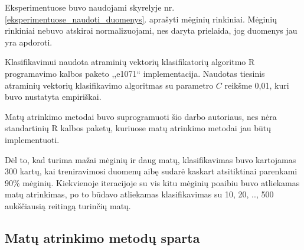 Eksperimentuose buvo naudojami skyrelyje nr. \ref{eksperimentuose_naudoti_duomenys}. aprašyti mėginių rinkiniai. Mėginių rinkiniai nebuvo atskirai normalizuojami, nes daryta prielaida, jog duomenys jau yra apdoroti. 

Klasifikavimui naudota atraminių vektorių klasifikatorių algoritmo R programavimo kalbos paketo ,,e1071`` implementacija. Naudotas tiesinis atraminių vektorių klasifikavimo algoritmas su parametro $C$ reikšme 0,01, kuri buvo nustatyta empiriškai.

Matų atrinkimo metodai buvo suprogramuoti šio darbo autoriaus, nes nėra standartinių R kalbos paketų, kuriuose matų atrinkimo metodai jau būtų implementuoti.

Dėl to, kad turima mažai mėginių ir daug matų, klasifikavimas buvo kartojamas 300 kartų, kai treniravimosi duomenų aibę sudarė kaskart atsitiktinai parenkami 90\% mėginių. Kiekvienoje iteracijoje su vis kitu mėginių poaibiu buvo atliekamas matų atrinkimas, po to būdavo atliekamas klasifikavimas su 10, 20, .., 500 aukščiausią reitingą turinčių matų.

\subsection{Matų atrinkimo metodų sparta}


